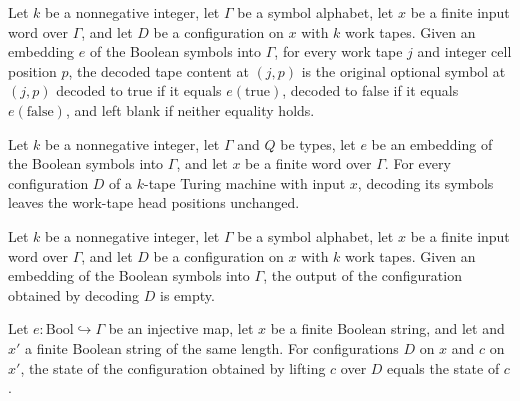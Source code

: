 \begin{theorem}
\label{Turing.Cfg.decodeSymbols_workTapes}
\leanok
{}
Let $k$ be a nonnegative integer, let $\Gamma$ be a symbol alphabet, let $x$ be a finite
input word over $\Gamma$, and let $D$ be a configuration on $x$ with $k$ work tapes.
Given an embedding $e$ of the Boolean symbols into $\Gamma$, for every work tape $j$ and
integer cell position $p$, the decoded tape content at $(j,p)$ is the original optional
symbol at $(j,p)$ decoded to true if it equals $e(\mathrm{true})$, decoded to false if
it equals $e(\mathrm{false})$, and left blank if neither equality holds.
\end{theorem}

\begin{theorem}
\label{Turing.Cfg.decodeSymbols_workTapePos}
\leanok
{}
Let $k$ be a nonnegative integer, let $\Gamma$ and $Q$ be types, let $e$ be an embedding
of the Boolean symbols into $\Gamma$, and let $x$ be a finite word over $\Gamma$. For
every configuration $D$ of a $k$-tape Turing machine with input $x$, decoding its
symbols leaves the work-tape head positions unchanged.
\end{theorem}

\begin{theorem}
\label{Turing.Cfg.decodeSymbols_output}
\leanok
{}
Let $k$ be a nonnegative integer, let $\Gamma$ be a symbol alphabet, let $x$ be a finite
input word over $\Gamma$, and let $D$ be a configuration on $x$ with $k$ work tapes.
Given an embedding of the Boolean symbols into $\Gamma$, the output of the configuration
obtained by decoding $D$ is empty.
\end{theorem}

\begin{theorem}
\label{Turing.Cfg.liftOver_state}
\leanok
{}
Let $e:\mathrm{Bool}\hookrightarrow\Gamma$ be an injective map, let $x$ be a finite Boolean string, and let
and $x'$ a finite Boolean string of the same length. For configurations $D$ on $x$ and
$c$ on $x'$, the state of the configuration obtained by lifting $c$ over $D$ equals the
state of $c$.
\end{theorem}

